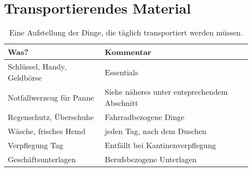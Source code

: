 \section{Transportierendes Material}

\begin{table}
  \centering
  \begin{tabular}{ll}
    \toprule
        Was?    & Kommentar \\
    \midrule
        Schlüssel, Handy, Geldbörse     & Essentials \\
        Notfallwerzeug für Panne        & Siehe näheres unter entsprechendem Abschnitt \\
        Regenschutz, Überschuhe         & Fahrradbezogene Dinge \\
        Wäsche, frisches Hemd           & jeden Tag, nach dem Duschen \\ 
        Verpflegung Tag                 & Entfällt bei Kantinenverpflegung \\
        Geschäftsunterlagen             & Berufsbezogene Unterlagen \\
    \bottomrule
  \end{tabular}
  \caption{Eine Aufstellung der Dinge, die täglich transportiert werden müssen.}
  \label{tab:transportmaterial}
\end{table}


